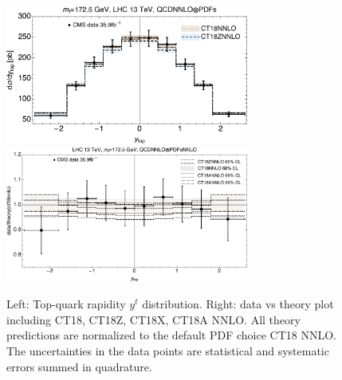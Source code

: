 \begin{figure}[tb]
\begin{center}
\includegraphics[width=8cm]{./fig/ttbar/CMS13-y-top-CT18NNLO-mt172p5_ect.pdf}
\includegraphics[width=8cm]{./fig/ttbar/CMS13-y-top-nnlo-ct18-zaxnnlo-mt172p5_ect.pdf}
\caption{Left: Top-quark rapidity $y^t$ distribution. 
Right: data vs theory plot including CT18, CT18Z, CT18X, CT18A NNLO. All theory predictions are normalized to the default PDF choice CT18 NNLO.
The uncertainties in the data points are statistical and systematic errors summed in quadrature.}
\label{yt}
\end{center}
\end{figure}




